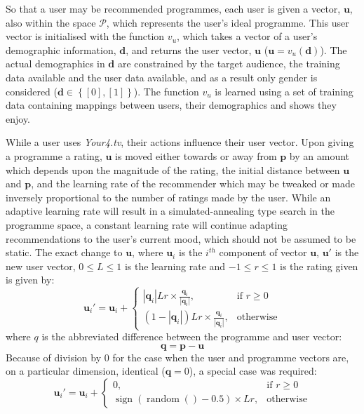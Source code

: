 		So that a user may be recommended programmes, each user is given a vector, $\mathbf{u}$, also within the space $\mathcal{P}$, which represents the user's ideal programme. This user vector is initialised with the function $v_u$, which takes a vector of a user's demographic information, $\mathbf{d}$, and returns the user vector, $\mathbf{u}$ ($\mathbf{u} = v_u(\mathbf{d})$). The actual demographics in $\mathbf{d}$ are constrained by the target audience, the training data available and the user data available, and as a result only gender is considered ($\mathbf{d} \in \left\{{ \left[ 0\right] ,\left[ 1\right] }\right\} $). The function $v_u$ is learned using a set of training data containing mappings between users, their demographics and shows they enjoy. 

		While a user uses \textit{Your4.tv}, their actions influence their user vector. Upon giving a programme a rating, $\mathbf{u}$ is moved either towards or away from $\mathbf{p}$ by an amount which depends upon the magnitude of the rating, the initial distance between $\mathbf{u}$ and $\mathbf{p}$, and the learning rate of the recommender which may be tweaked or made inversely proportional to the number of ratings made by the user. While an adaptive learning rate will result in a simulated-annealing type search in the programme space, a constant learning rate will continue adapting recommendations to the user's current mood, which should not be assumed to be static. The exact change to $\mathbf{u}$, where $\mathbf{u}_{i}$ is the $i^{th}$ component of vector $\mathbf{u}$, $\mathbf{u}'$ is the new user vector, $0 \leq L \leq 1$ is the learning rate and $-1 \leq r \leq 1$ is the rating given is given by:
		$$
			\mathbf{u}_{i}' =
			\mathbf{u}_{i} + \begin{cases}
				\left|\mathbf{q}_i\right|Lr \times \frac{\mathbf{q}_i}{\left|\mathbf{q}_i\right|},&
					\text{if } r\geq 0\\
				(1-\left|\mathbf{q}_i\right|)Lr \times \frac{\mathbf{q}_i}{\left|\mathbf{q}_i\right|},&
					\text{otherwise}
			\end{cases}
		$$
		where $q$ is the abbreviated difference between the programme and user vector:
		$$
			\mathbf{q} = \mathbf{p}-\mathbf{u}
		$$
		Because of division by 0 for the case when the user and programme vectors are, on a particular dimension, identical ($\mathbf{q}=0$), a special case was required:
		$$
			\mathbf{u}_{i}' =
			\mathbf{u}_{i} + \begin{cases}
				0,&
					\text{if } r\geq 0\\
				\operatorname{sign}(\operatorname{random}()-0.5)\times Lr,&
					\text{otherwise}
			\end{cases}
		$$

